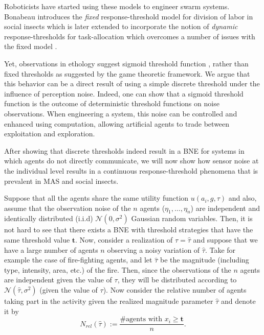 \documentclass{nature}
\def\td{\mathbf{t}}   %
\begin{document}
Roboticists have started using these models to engineer swarm systems\cite{Krieger2000}. Bonabeau \cite{Bonabeau1996} introduces the \emph{fixed} response-threshold model for division of labor in social insects which is later extended to incorporate the notion of \emph{dynamic} response-thresholds for task-allocation which overcomes a number of issues with the fixed model \cite{Theraulaz1998}.

Yet, observations in ethology suggest sigmoid threshold function \cite{Bonabeau1996}, rather than fixed thresholds as suggested by the game theoretic framework. We argue that this behavior can be a direct result of using a simple discrete threshold under the influence of perception noise. Indeed, one can show that a sigmoid threshold function is the outcome of deterministic threshold functions on noise observations. When engineering a system, this noise can be controlled and enhanced using computation, allowing artificial agents to trade between exploitation and exploration. 

After showing that discrete thresholds indeed result in a BNE for systems in which agents do not directly communicate, we will now show how sensor noise at the individual level results in a continuous response-threshold phenomena that is prevalent in MAS and social insects. 

Suppose that all the agents share the same utility function $u(a_i,g,\tau)$ and also, assume that the observation noise of the $n$ agents ($\eta_1,\ldots,\eta_n$) are independent and identically distributed (i.i.d) $\mathcal{N}(0,\sigma^2)$ Gaussian random variables. Then, it is not hard to see that there exists a BNE with threshold strategies that have the same threshold value $\td$\cite{Morris2000}. Now, consider a realization of $\tau=\hat{\tau}$ and suppose that we have a large number of agents $n$ observing a noisy variation of $\hat{\tau}$. Take for example the case of fire-fighting agents, and let $\hat{\tau}$ be the magnitude (including type, intensity, area, etc.) of the fire. Then, since the observations of the $n$ agents are independent given the value of $\tau$, they will be distributed according to $\mathcal{N}(\hat{\tau},\sigma^2)$ (given the value of $\tau$). Now consider the relative number of agents taking part in the activity given the realized magnitude parameter $\hat{\tau}$ and denote it by 
\begin{equation}\label{eqn:Nrel}
	N_{rel}(\hat{\tau}):=\frac{\#\text{agents with }x_i\geq \td}{n}.
\end{equation}
\end{document}
